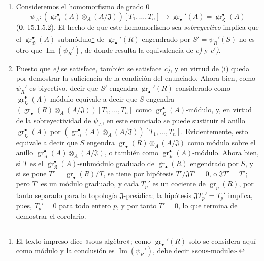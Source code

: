 \begin{enumerate}
  \item[(i)] Consideremos el homomorfismo de grado $0$
  \[
    \psi_A:(\operatorname{gr}_{\mathfrak K}^\bullet(A)\otimes_A(A/\mathfrak J))[T_1,\ldots,T_n]\longrightarrow\operatorname{gr}_\bullet'(A)=\operatorname{gr}_{\mathfrak L}^\bullet(A)
  \]
  (\textbf{0}, 15.1.5.2). El hecho de que este homomorfismo sea \emph{sobreyectivo} implica que el $\operatorname{gr}_{\mathfrak L}^\bullet(A)$-submódulo\footnote{El texto impreso dice «sous-algèbre»; como $\operatorname{gr}_\bullet'(R)$ solo se considera aquí como módulo y la conclusión es $\operatorname{Im}(\psi_R')$, debe decir «sous-module».} de $\operatorname{gr}_\bullet'(R)$ engendrado por $S'=\psi_R'(S)$ no es otro que $\operatorname{Im}(\psi_R')$, de donde resulta la equivalencia de \emph{c)} y \emph{c$'$)}.
  \item[(ii)] Puesto que \emph{e)} se satisface, también se satisface \emph{c)}, y en virtud de (i) queda por demostrar la suficiencia de la condición del enunciado. Ahora bien, como $\psi_R'$ es biyectivo, decir que $S'$ engendra $\operatorname{gr}_\bullet'(R)$ considerado como $\operatorname{gr}_{\mathfrak L}^\bullet(A)$-módulo equivale a decir que $S$ engendra $(\operatorname{gr}_\bullet(R)\otimes_A(A/\mathfrak J))[T_1,\ldots,T_n]$ como $\operatorname{gr}_{\mathfrak L}^\bullet(A)$-módulo, y, en virtud de la sobreyectividad de $\psi_A$, en este enunciado se puede sustituir el anillo $\operatorname{gr}_{\mathfrak L}^\bullet(A)$ por $(\operatorname{gr}_{\mathfrak K}^\bullet(A)\otimes_A(A/\mathfrak J))[T_1,\ldots,T_n]$. Evidentemente, esto equivale a decir que $S$ engendra $\operatorname{gr}_\bullet(R)\otimes_A(A/\mathfrak J)$ como módulo sobre el anillo $\operatorname{gr}_{\mathfrak K}^\bullet(A)\otimes_A(A/\mathfrak J)$, o también como $\operatorname{gr}_{\mathfrak K}^\bullet(A)$-módulo. Ahora bien, si $T$ es el $\operatorname{gr}_{\mathfrak K}^\bullet(A)$-submódulo graduado de $\operatorname{gr}_\bullet(R)$ engendrado por $S$, y si se pone $T'=\operatorname{gr}_\bullet(R)/T$, se tiene por hipótesis $T'/\mathfrak JT'=0$, o $\mathfrak JT'=T'$; pero $T'$ es un módulo graduado, y cada $T_p'$ es un cociente de $\operatorname{gr}_p(R)$, por tanto separado para la topología $\mathfrak J$-preádica; la hipótesis $\mathfrak JT_p'=T_p'$ implica, pues, $T_p'=0$ para todo entero $p$, y por tanto $T'=0$, lo que termina de demostrar el corolario.
\end{enumerate}
